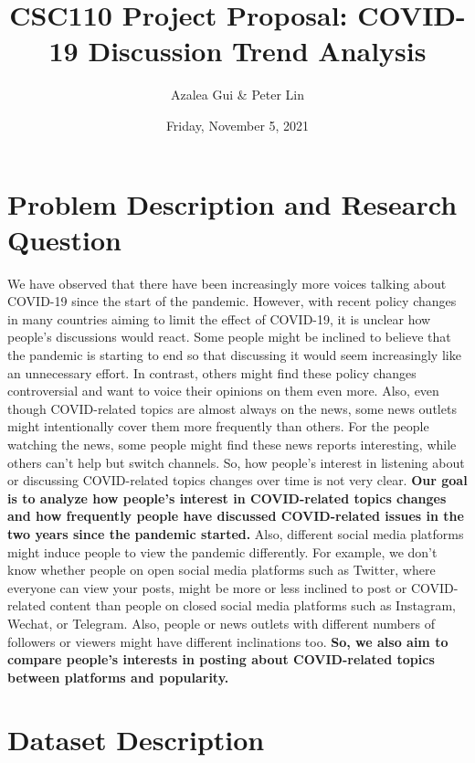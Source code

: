 \documentclass[fontsize=11pt]{article}
\title{CSC110 Project Proposal: COVID-19 Discussion Trend Analysis}
\author{Azalea Gui \& Peter Lin}
\date{Friday, November 5, 2021}
\begin{document}
    \maketitle

    \section*{Problem Description and Research Question}

    \indent

    We have observed that there have been increasingly more voices talking about COVID-19 since the start of the pandemic. However, with recent policy changes in many countries aiming to limit the effect of COVID-19, it is unclear how people’s discussions would react. Some people might be inclined to believe that the pandemic is starting to end so that discussing it would seem increasingly like an unnecessary effort. In contrast, others might find these policy changes controversial and want to voice their opinions on them even more. Also, even though COVID-related topics are almost always on the news, some news outlets might intentionally cover them more frequently than others. For the people watching the news, some people might find these news reports interesting, while others can’t help but switch channels. So, how people’s interest in listening about or discussing COVID-related topics changes over time is not very clear. \textbf{Our goal is to analyze how people’s interest in COVID-related topics changes and how frequently people have discussed COVID-related issues in the two years since the pandemic started.} Also, different social media platforms might induce people to view the pandemic differently. For example, we don’t know whether people on open social media platforms such as Twitter, where everyone can view your posts, might be more or less inclined to post or COVID-related content than people on closed social media platforms such as Instagram, Wechat, or Telegram. Also, people or news outlets with different numbers of followers or viewers might have different inclinations too. \textbf{So, we also aim to compare people’s interests in posting about COVID-related topics between platforms and popularity.}

    \section*{Dataset Description}

    \indent
\end{document}
